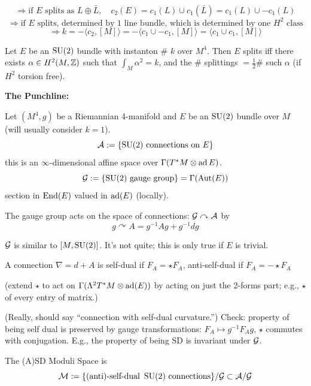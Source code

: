 \documentclass[main]{subfiles}
\begin{document}
\[
\Rightarrow \text{if } E \text{ splits as } L\oplus\bar L,\quad c_2(E) = c_1(L)\cup c_1(\bar L) = c_1(L)\cup -c_1(L)
\]
\[
\Rightarrow \text{if } E \text{ splits, determined by 1 line bundle, which is determined by one } H^2 \text{ class}
\]
\[
\Rightarrow k = -\langle c_2,[M]\rangle = -\langle c_1\cup -c_1, [M]\rangle = \langle c_1\cup c_1, [M]\rangle
\]

\begin{lemma}
Let $E$ be an $\operatorname{SU}(2)$ bundle with instanton \# $k$ over $M^4$. Then $E$ splits iff there exists $\alpha \in H^2(M,\mathbb Z)$ such that $\int_M \alpha^2 = k$, and the \# splittings $= \tfrac12 \#$ such $\alpha$ (if $H^2$ torsion free).
\end{lemma}

\textbf{The Punchline:}

\begin{definition}
Let $(M^4,g)$ be a Riemannian 4-manifold and $E$ be an $\operatorname{SU}(2)$ bundle over $M$ (will usually consider $k=1$).
\[
\mathcal{A} := \{\operatorname{SU}(2) \text{ connections on } E\}
\]
this is an $\infty$-dimensional affine space over $\Gamma(T^\ast M\otimes \operatorname{ad} E)$.
\[
\mathcal{G} := \{\operatorname{SU}(2)\text{ gauge group}\} = \Gamma(\operatorname{Aut}(E))
\]
section in $\operatorname{End}(E)$ valued in $\operatorname{ad}(E)$ (locally).
\end{definition}

The gauge group acts on the space of connections: $\mathcal{G} \curvearrowright \mathcal{A}$ by
\[
g\curvearrowright A = g^{-1}Ag+g^{-1}dg
\]

$\mathcal{G}$ is similar to $[M,\operatorname{SU}(2)]$. It's not quite; this is only true if $E$ is trivial.

\begin{definition}
A connection $\nabla = d+A$ is self-dual if $F_A = \star F_A$, anti-self-dual if $F_A = -\star F_A$

(extend $\star$ to act on $\Gamma(\Lambda^2 T^\ast M \otimes \operatorname{ad}(E))$ by acting on just the 2-forms part; e.g., $\star$ of every entry of matrix.)
\end{definition}

(Really, should say ``connection with self-dual curvature.'') Check: property of being self dual is preserved by gauge transformations: $F_A \mapsto g^{-1}F_A g$, $\star$ commutes with conjugation. E.g., the property of being SD is invariant under $\mathcal{G}$.

\begin{definition}
The (A)SD Moduli Space is
\[
\mathcal{M} := \{(\text{anti})\text{-self-dual } \operatorname{SU}(2) \text{ connections}\}/\mathcal{G} \subset \mathcal{A}/\mathcal{G}
\]
\end{definition}
\end{document}
